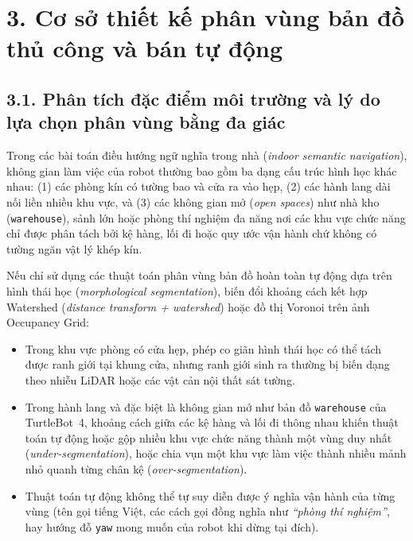 \section*{3. Cơ sở thiết kế phân vùng bản đồ thủ công và bán tự động}

\subsection*{3.1. Phân tích đặc điểm môi trường và lý do lựa chọn phân vùng bằng đa giác}

Trong các bài toán điều hướng ngữ nghĩa trong nhà (\textit{indoor semantic navigation}), không gian làm việc của robot thường bao gồm ba dạng cấu trúc hình học khác nhau: (1) các phòng kín có tường bao và cửa ra vào hẹp, (2) các hành lang dài nối liền nhiều khu vực, và (3) các không gian mở (\textit{open spaces}) như nhà kho (\texttt{warehouse}), sảnh lớn hoặc phòng thí nghiệm đa năng nơi các khu vực chức năng chỉ được phân tách bởi kệ hàng, lối đi hoặc quy ước vận hành chứ không có tường ngăn vật lý khép kín.

Nếu chỉ sử dụng các thuật toán phân vùng bản đồ hoàn toàn tự động dựa trên hình thái học (\textit{morphological segmentation}), biến đổi khoảng cách kết hợp Watershed (\textit{distance transform + watershed}) hoặc đồ thị Voronoi trên ảnh Occupancy Grid:
\begin{itemize}[leftmargin=1.2cm]
  \item Trong khu vực phòng có cửa hẹp, phép co giãn hình thái học có thể tách được ranh giới tại khung cửa, nhưng ranh giới sinh ra thường bị biến dạng theo nhiễu LiDAR hoặc các vật cản nội thất sát tường.
  \item Trong hành lang và đặc biệt là không gian mở như bản đồ \texttt{warehouse} của TurtleBot~4, khoảng cách giữa các kệ hàng và lối đi thông nhau khiến thuật toán tự động hoặc gộp nhiều khu vực chức năng thành một vùng duy nhất (\textit{under-segmentation}), hoặc chia vụn một khu vực làm việc thành nhiều mảnh nhỏ quanh từng chân kệ (\textit{over-segmentation}).
  \item Thuật toán tự động không thể tự suy diễn được ý nghĩa vận hành của từng vùng (tên gọi tiếng Việt, các cách gọi đồng nghĩa như \textit{``phòng thí nghiệm''}, hay hướng đỗ \texttt{yaw} mong muốn của robot khi dừng tại đích).
\end{itemize}

